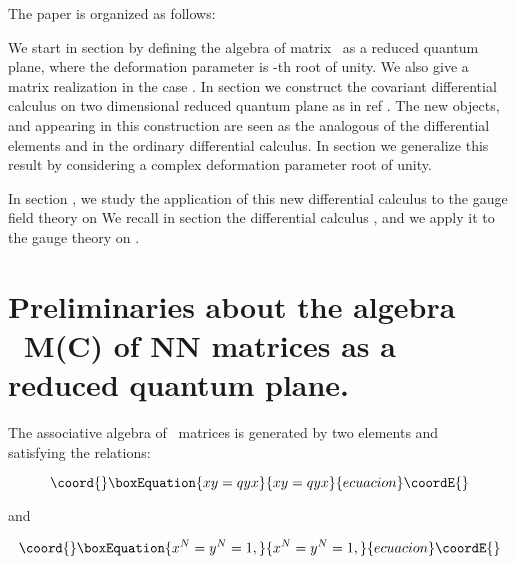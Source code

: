 \documentclass[a4paper,12pt,thmsa]{article}
\begin{document}
The paper is organized as follows:

We start in section \coordHE{} by defining the algebra of \coordHE{} matrix \ as a
reduced quantum plane, where the deformation parameter \coordHE{} is \coordHE{}-th root of
unity. We also give a matrix realization in the case \coordHE{}. In section \coordHE{}
we construct the covariant differential calculus \coordHE{} on two dimensional
reduced quantum plane as in ref \myHighlight{$\left[ 1-3\right] $}\coordHE{}. The new objects, \coordHE{}
and \coordHE{} appearing in this construction are seen as the analogous of the
differential elements \coordHE{} and \coordHE{} in the ordinary differential calculus.
In section \coordHE{} we generalize this result by considering a complex
deformation parameter \coordHE{}  \coordHE{} root of unity.

In section \coordHE{}, we study the application of this new differential calculus \coordHE{} to the gauge field theory on \coordHE{} We recall in section \coordHE{} the
differential calculus \coordHE{}  \myHighlight{$\left[ 6-9\right] $}\coordHE{}, and we apply it to the
gauge theory on \coordHE{}.

\section{Preliminaries about the algebra \ M\coordHE{}(C) of N\myHighlight{$\times $}\coordHE{}N matrices
as a reduced quantum plane.}

The associative algebra of \coordHE{} \ matrices is generated by two
elements \coordHE{} and \ \coordHE{}  \myHighlight{$[10]$}\coordHE{} satisfying the relations:

\begin{equation}\coord{}\boxEquation{
xy=qyx
}{
xy=qyx
}{ecuacion}\coordE{}\end{equation}

and

\begin{equation}\coord{}\boxEquation{
x^N=y^N=1,
}{
x^N=y^N=1,
}{ecuacion}\coordE{}\end{equation}
\end{document}
